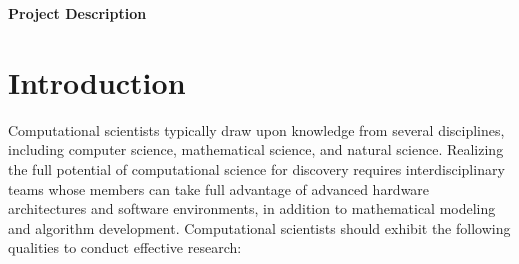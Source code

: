 \documentclass[11pt]{NSFamsart}
\begin{document}
\newpage \setcounter{page}{1} %





\centerline{\Large \textbf{Project Description}} \hypertarget{ProjDesc}{}
\vspace{-2ex}

\setcounter{tocdepth}{1}
\tableofcontents %

\vspace{-6ex}

\section{Introduction}
Computational scientists typically draw upon knowledge from several disciplines, including computer science, mathematical science, and natural science.  Realizing the full potential of computational science for discovery requires interdisciplinary teams whose members can take full advantage of advanced hardware architectures and software environments, in addition to mathematical modeling and algorithm development.  Computational scientists should exhibit the following qualities to conduct effective research:
\end{document}
